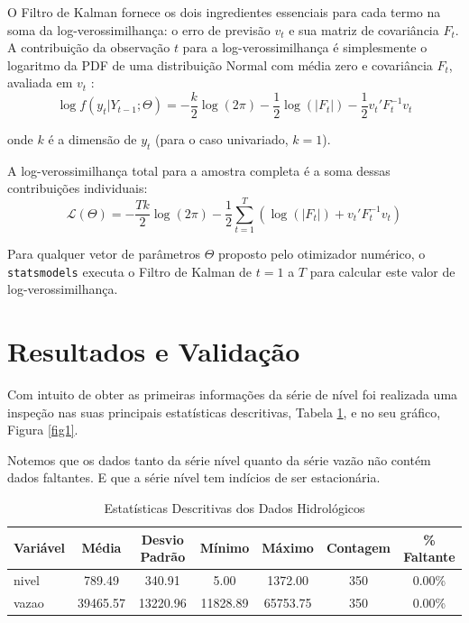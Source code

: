 \documentclass[ 12pt,a4paper ]{article} %
\begin{document}
	O Filtro de Kalman fornece os dois ingredientes essenciais para cada termo na soma da log-verossimilhança: o erro de previsão $v_t$ e sua matriz de covariância $F_t$. A contribuição da observação $t$ para a log-verossimilhança é simplesmente o logaritmo da PDF de uma distribuição Normal com média zero e covariância $F_t$, avaliada em $v_t$ \cite{Stoffer}:
	$$ \log f(y_t | Y_{t-1}; \Theta) = -\frac{k}{2} \log(2\pi) - \frac{1}{2} \log(|F_t|) - \frac{1}{2} v_t' F_t^{-1} v_t $$
	
	onde $k$ é a dimensão de $y_t$ (para o caso univariado, $k=1$).
	
	A log-verossimilhança total para a amostra completa é a soma dessas contribuições individuais:
	$$ \mathcal{L}(\Theta) = -\frac{T k}{2} \log(2\pi) - \frac{1}{2} \sum_{t=1}^T \left( \log(|F_t|) + v_t' F_t^{-1} v_t \right) $$
	
	Para qualquer vetor de parâmetros $\Theta$ proposto pelo otimizador numérico, o \texttt{statsmodels} executa o Filtro de Kalman de $t=1$ a $T$ para calcular este valor de log-verossimilhança. %
	

	
	
	
	
	
	
	\section{Resultados e Validação}
	
	Com intuito de obter as primeiras informações da série de nível foi realizada uma inspeção nas suas principais estatísticas descritivas, Tabela \ref{tab1}, e no seu gráfico, Figura \ref{fig1}.
	
	
	
	Notemos que os dados tanto da série nível quanto da série vazão não contém dados faltantes. E que a série nível tem indícios de ser estacionária.
	
	\begin{table}[h!]
		\centering
		\caption{Estatísticas Descritivas dos Dados Hidrológicos}
		\label{tab1}
		\begin{tabular}{lcccccc}
			\hline
			\textbf{Variável} & \textbf{Média} & \textbf{Desvio Padrão} & \textbf{Mínimo} & \textbf{Máximo} & \textbf{Contagem} & \textbf{\% Faltante} \\
			\hline
			nivel & 789.49   & 340.91    & 5.00      & 1372.00   & 350 & 0.00\% \\
			vazao & 39465.57 & 13220.96  & 11828.89  & 65753.75  & 350 & 0.00\% \\
			\hline
		\end{tabular}
	\end{table}
	
\end{document}
